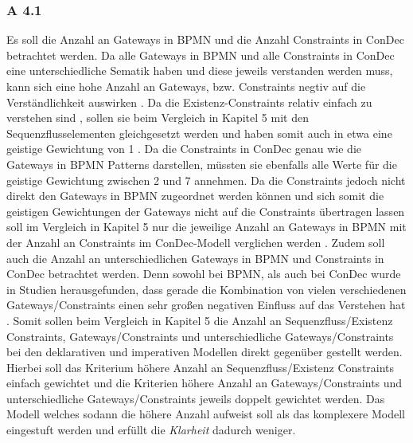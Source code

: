 \subsubsection{A 4.1}
Es soll die Anzahl an Gateways in BPMN und die Anzahl Constraints in ConDec betrachtet werden. Da alle Gateways in BPMN und alle Constraints in ConDec eine unterschiedliche Sematik haben und diese jeweils verstanden werden muss, kann sich eine hohe Anzahl an Gateways, bzw. Constraints negtiv auf die Verständlichkeit auswirken \cite{gruhn2006adopting, thesis_maja}. \newline
Da die Existenz-Constraints relativ einfach zu verstehen sind \cite{thesis_maja}, sollen sie beim Vergleich in Kapitel 5 mit den Sequenzflusselementen gleichgesetzt werden und haben somit auch in etwa eine geistige Gewichtung von 1 \cite{thesis_maja,haisjackl2014understanding, gruhn2006adopting}. \newline
Da die Constraints in ConDec genau wie die Gateways in BPMN Patterns darstellen, müssten sie ebenfalls alle Werte für die geistige Gewichtung zwischen 2 und 7 annehmen. Da die Constraints jedoch nicht direkt den Gateways in BPMN zugeordnet werden können und sich somit die geistigen Gewichtungen der Gateways nicht auf die Constraints übertragen lassen soll im Vergleich in Kapitel 5 nur die jeweilige Anzahl an Gateways in BPMN mit der Anzahl an Constraints im ConDec-Modell verglichen werden \cite{thesis_maja,haisjackl2014understanding, gruhn2006adopting}. \newline
Zudem soll auch die Anzahl an unterschiedlichen Gateways in BPMN und Constraints in ConDec betrachtet werden. Denn sowohl bei BPMN, als auch bei ConDec wurde in Studien herausgefunden, dass gerade die Kombination von vielen verschiedenen Gateways/Constraints einen sehr großen negativen Einfluss auf das Verstehen hat \cite{gruhn2006adopting, thesis_maja,haisjackl2014understanding}. \newline
Somit sollen beim Vergleich in Kapitel 5 die Anzahl an Sequenzfluss/Existenz Constraints, Gateways/Constraints und unterschiedliche Gateways/Constraints bei den deklarativen und imperativen Modellen direkt gegenüber gestellt werden. Hierbei soll das Kriterium höhere Anzahl an Sequenzfluss/Existenz Constraints einfach gewichtet und die Kriterien höhere Anzahl an Gateways/Constraints und unterschiedliche Gateways/Constraints jeweils doppelt gewichtet werden. Das Modell welches sodann die höhere Anzahl aufweist soll als das komplexere Modell eingestuft werden und erfüllt die \textit{Klarheit} dadurch weniger.



